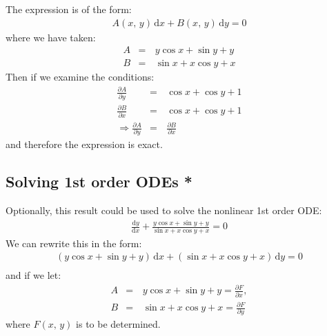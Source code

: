 \documentclass[letterpaper,10pt,english]{jupyterBook}
\begin{document}
\sphinxAtStartPar
The expression is of the form:
\begin{equation*}
\begin{split}A(x,\, y)\,\mathrm{d}x + B(x,\, y)\,\mathrm{d}y = 0\end{split}
\end{equation*}
\sphinxAtStartPar
where we have taken:
\begin{equation*}
\begin{split}A &=&\, y\cos{x}+\sin{y}+y \\
B &=&\, \sin{x}+x\cos{y}+x\end{split}
\end{equation*}
\sphinxAtStartPar
Then if we examine the conditions:
\begin{equation*}
\begin{split}\frac{\partial A}{\partial y} &=&\, \cos{x} + \cos{y} + 1\\
\frac{\partial B}{\partial x} &=&\, \cos{x} + \cos{y} + 1\\
\Rightarrow \frac{\partial A}{\partial y} &=&\, \frac{\partial B}{\partial x}\end{split}
\end{equation*}
\sphinxAtStartPar
and therefore the expression is exact.


\subsection{Solving 1st order ODEs *}
\label{\detokenize{VectorCalculus/partialdifferentiation:solving-1st-order-odes}}
\sphinxAtStartPar
Optionally, this result could be used to solve the nonlinear 1st order ODE:
\begin{equation*}
\begin{split}\frac{\mathrm{d}y}{\mathrm{d}x} + \frac{y\cos{x} + \sin{y} + y}{\sin{x} + x\cos{y} + x}=0\end{split}
\end{equation*}
\sphinxAtStartPar
We can rewrite this in the form:
\begin{equation*}
\begin{split}(y\cos{x} + \sin{y} + y)\,\mathrm{d}x + (\sin{x} + x\cos{y} + x)\,\mathrm{d}y = 0\\\end{split}
\end{equation*}
\sphinxAtStartPar
and if we let:
\begin{equation*}
\begin{split}A &=&\, y\cos{x} + \sin{y} + y = \frac{\partial F}{\partial x}, \\
B &=&\, \sin{x} + x\cos{y} + x = \frac{\partial F}{\partial y}\end{split}
\end{equation*}
\sphinxAtStartPar
where \(F(x,\,y)\) is to be determined.
\end{document}
